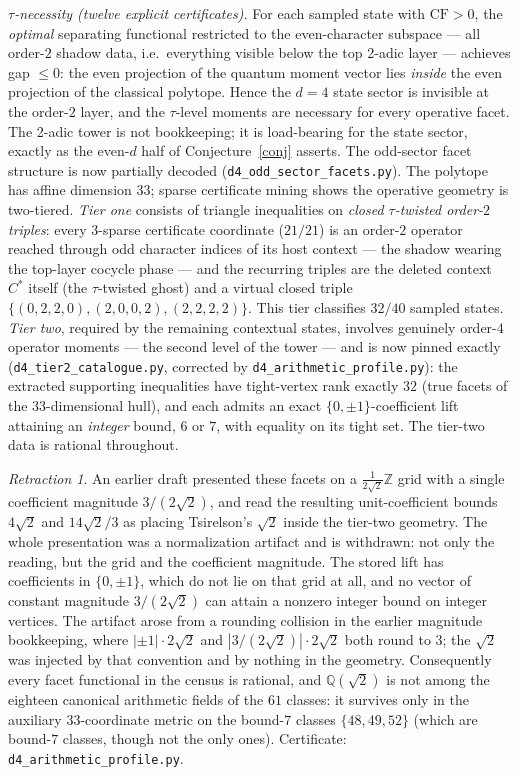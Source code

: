 \documentclass[11pt]{article}
\theoremstyle{remark}
\newtheorem{retraction}{Retraction}
\theoremstyle{plain}
\begin{document}
\emph{$\tau$-necessity (twelve explicit certificates).} For each sampled state with
$\mathrm{CF}>0$, the \emph{optimal} separating functional restricted to the
even-character subspace --- all order-$2$ shadow data, i.e.\ everything visible below
the top 2-adic layer --- achieves gap $\le 0$: the even projection of the quantum moment
vector lies \emph{inside} the even projection of the classical polytope. Hence the
$d=4$ state sector is invisible at the order-$2$ layer, and the $\tau$-level moments are
necessary for every operative facet. The 2-adic tower is not bookkeeping; it is
load-bearing for the state sector, exactly as the even-$d$ half of
Conjecture~\ref{conj} asserts. The odd-sector facet structure is now partially decoded
(\texttt{d4\_odd\_sector\_facets.py}). The polytope has affine dimension $33$; sparse
certificate mining shows the operative geometry is two-tiered. \emph{Tier one} consists
of triangle inequalities on \emph{closed $\tau$-twisted order-$2$ triples}: every
$3$-sparse certificate coordinate ($21/21$) is an order-$2$ operator reached through
odd character indices of its host context --- the shadow wearing the top-layer cocycle
phase --- and the recurring triples are the deleted context $C^*$ itself (the
$\tau$-twisted ghost) and a virtual closed triple
$\{(0,2,2,0),(2,0,0,2),(2,2,2,2)\}$. This tier classifies $32/40$ sampled states.
\emph{Tier two}, required by the remaining contextual states, involves genuinely
order-$4$ operator moments --- the second level of the tower --- and is now pinned
exactly (\texttt{d4\_tier2\_catalogue.py}, corrected by \texttt{d4\_arithmetic\_profile.py}):
the extracted supporting inequalities have tight-vertex rank exactly $32$ (true facets of the
$33$-dimensional hull), and each admits an exact $\{0,\pm1\}$-coefficient lift attaining an
\emph{integer} bound, $6$ or $7$, with equality on its tight set. The tier-two data is
rational throughout.

\begin{retraction}\label{ret:sqrt2}
An earlier draft presented these facets on a $\tfrac{1}{2\sqrt2}\mathbb Z$ grid with a single
coefficient magnitude $3/(2\sqrt2)$, and read the resulting unit-coefficient bounds
$4\sqrt2$ and $14\sqrt2/3$ as placing Tsirelson's $\sqrt2$ inside the tier-two geometry.
The whole presentation was a normalization artifact and is withdrawn: not only the reading,
but the grid and the coefficient magnitude. The stored lift has coefficients in
$\{0,\pm1\}$, which do not lie on that grid at all, and no vector of constant magnitude
$3/(2\sqrt2)$ can attain a nonzero integer bound on integer vertices. The artifact arose from a
rounding collision in the earlier magnitude bookkeeping, where $|{\pm1}|\cdot2\sqrt2$ and
$|3/(2\sqrt2)|\cdot2\sqrt2$ both round to $3$; the $\sqrt2$ was injected by that convention
and by nothing in the geometry. Consequently every facet functional in the census is
rational, and $\mathbb Q(\sqrt2)$ is not among the eighteen canonical arithmetic fields of
the $61$ classes: it survives only in the auxiliary $33$-coordinate metric on the bound-$7$
classes $\{48,49,52\}$ (which are bound-$7$ classes, though not the only ones). Certificate: \texttt{d4\_arithmetic\_profile.py}.
\end{retraction}
\end{document}
